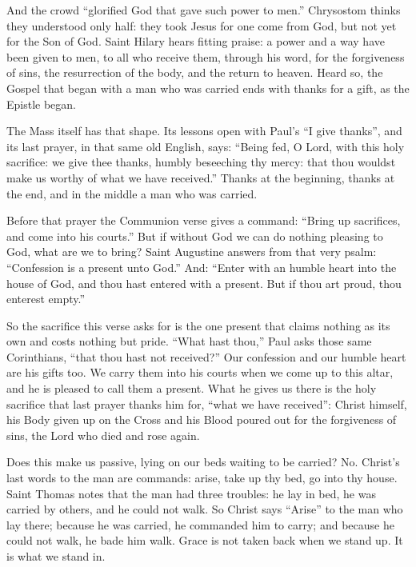 And the crowd ``glorified God that gave such power to men.'' Chrysostom thinks
they understood only half: they took Jesus for one come from God, but not yet
for the Son of God. Saint Hilary hears fitting praise: a power and a way have
been given to men, to all who receive them, through his word, for the
forgiveness of sins, the resurrection of the body, and the return to heaven.
Heard so, the Gospel that began with a man who was carried ends with thanks
for a gift, as the Epistle began.

\bigskip

The Mass itself has that shape. Its lessons open with Paul's ``I give
thanks'', and its last prayer, in that same old English, says: ``Being fed, O
Lord, with this holy sacrifice: we give thee thanks, humbly beseeching thy
mercy: that thou wouldst make us worthy of what we have received.'' Thanks at
the beginning, thanks at the end, and in the middle a man who was carried.

Before that prayer the Communion verse gives a command: ``Bring up sacrifices, and
come into his courts.'' But if without God we can do nothing pleasing to God,
what are we to bring? Saint Augustine answers from that very psalm:
``Confession is a present unto God.'' And: ``Enter with an humble heart into
the house of God, and thou hast entered with a present. But if thou art proud,
thou enterest empty.''

So the sacrifice this verse asks for is the one present that claims nothing as
its own and costs nothing but pride. ``What hast thou,'' Paul asks those same
Corinthians, ``that thou hast not received?'' Our confession and our humble
heart are his gifts too. We carry them into his courts when we come up to this
altar, and he is pleased to call them a present. What he gives us there is the
holy sacrifice that last prayer thanks him for, ``what we have received'':
Christ himself, his Body given up on the Cross and his Blood poured out for
the forgiveness of sins, the Lord who died and rose again.

\bigskip

Does this make us passive, lying on our beds waiting to be carried? No.
Christ's last words to the man are commands: arise, take up thy bed, go into
thy house. Saint Thomas notes that the man had three troubles: he lay in bed,
he was carried by others, and he could not walk. So Christ says ``Arise'' to
the man who lay there; because he was carried, he commanded him to carry; and
because he could not walk, he bade him walk. Grace is not taken back when we
stand up. It is what we stand in.

